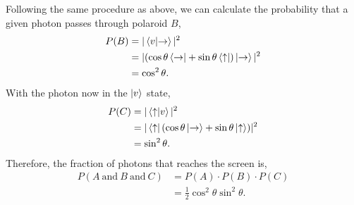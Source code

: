 Following the same procedure as above, we can calculate the probability that a given photon passes through polaroid
$B$,
\begin{align}
    P(B) &= |\bra{v} \ket{\rightarrow}|^2 \\
        &= |(\cos \theta \bra{\rightarrow} + \sin \theta \bra{\uparrow}) \ket{\rightarrow}|^2 \\
        &= \cos^2 \theta.
\end{align}
With the photon now in the $\ket{v}$ state,
\begin{align}
    P(C) &= |\bra{\uparrow} \ket{v}|^2 \\
        &= |\bra{\uparrow} (\cos \theta \ket{\rightarrow} + \sin \theta \ket{\uparrow})|^2 \\
        &= \sin^2 \theta.
\end{align}
Therefore, the fraction of photons that reaches the screen is,
\begin{align}
    P(A~\text{and}~B~\text{and}~C) &= P(A) \cdot P(B) \cdot P(C) \\
        &= \boxed{\tfrac{1}{2} \cos^2 \theta \sin^2 \theta}.
\end{align}
